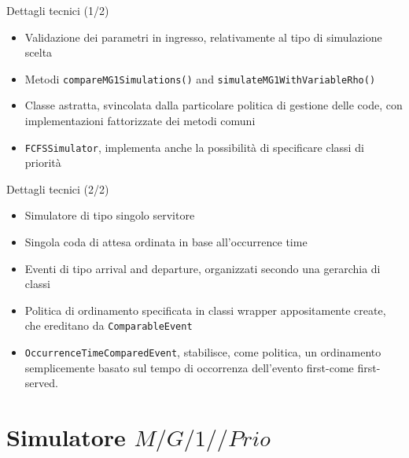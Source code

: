\documentclass[slidestop,compress,mathserif]{beamer}
\begin{document}
\begin{frame}{Dettagli tecnici (1/2)}
\vfill
\begin{itemize}
	\item Validazione dei parametri in ingresso, relativamente al tipo di simulazione scelta
	\item Metodi {\tt compareMG1Simulations()} and {\tt simulateMG1WithVariableRho()}
	\item Classe astratta, svincolata dalla particolare politica di gestione delle code, con implementazioni fattorizzate dei metodi comuni
	\item {\tt FCFSSimulator}, implementa anche la possibilit\`a di specificare classi di priorit\`a
\end{itemize}
\vfill
\end{frame}
\begin{frame}{Dettagli tecnici (2/2)}
\vfill
\begin{itemize}
	\item Simulatore di tipo singolo servitore
	\item Singola coda di attesa ordinata in base all'occurrence time
	\item Eventi di tipo arrival and departure, organizzati secondo una gerarchia di classi
	\item Politica di ordinamento specificata in classi wrapper appositamente create, che ereditano da {\tt ComparableEvent}
	\item {\tt OccurrenceTimeComparedEvent}, stabilisce, come politica, un ordinamento semplicemente basato sul tempo di occorrenza dell'evento first-come first-served.
\end{itemize}
\vfill
\end{frame}

\section{Simulatore $M/G/1//Prio$}
\end{document}
